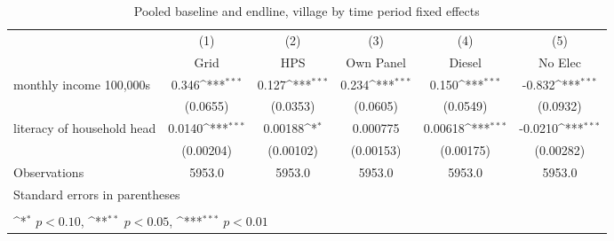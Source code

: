 \begin{table}[htbp]\centering
\def\sym#1{\ifmmode^{#1}\else\(^{#1}\)\fi}
\caption{Pooled baseline and endline, village by time period fixed effects \label{tab: LABEL}}
\begin{tabular*}{1.0\hsize}{@{\hskip\tabcolsep\extracolsep\fill}l*{5}{c}}
\toprule
                                &\multicolumn{1}{c}{(1)}&\multicolumn{1}{c}{(2)}&\multicolumn{1}{c}{(3)}&\multicolumn{1}{c}{(4)}&\multicolumn{1}{c}{(5)}\\
                                &\multicolumn{1}{c}{Grid}&\multicolumn{1}{c}{HPS}&\multicolumn{1}{c}{Own Panel}&\multicolumn{1}{c}{Diesel}&\multicolumn{1}{c}{No Elec}\\
\midrule
monthly income 100,000s         &       0.346\sym{***}&       0.127\sym{***}&       0.234\sym{***}&       0.150\sym{***}&      -0.832\sym{***}\\
                                &    (0.0655)         &    (0.0353)         &    (0.0605)         &    (0.0549)         &    (0.0932)         \\
\addlinespace
literacy of household head      &      0.0140\sym{***}&     0.00188\sym{*}  &    0.000775         &     0.00618\sym{***}&     -0.0210\sym{***}\\
                                &   (0.00204)         &   (0.00102)         &   (0.00153)         &   (0.00175)         &   (0.00282)         \\
\midrule
Observations                    &      5953.0         &      5953.0         &      5953.0         &      5953.0         &      5953.0         \\
\bottomrule
\multicolumn{6}{l}{\footnotesize Standard errors in parentheses}\\
\multicolumn{6}{l}{\footnotesize }\\
\multicolumn{6}{l}{\footnotesize \sym{*} \(p<0.10\), \sym{**} \(p<0.05\), \sym{***} \(p<0.01\)}\\
\end{tabular*}
\end{table}

